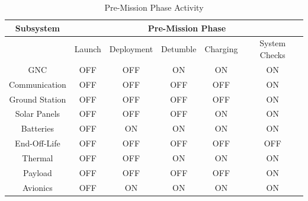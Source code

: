 \documentclass[3p]{elsarticle}
\begin{document}
\begin{table}[htbp]
  \centering
  \caption{Pre-Mission Phase Activity}
    \begin{tabular}{|c|c|c|c|c|c|}
    \hline
    \textbf{Subsystem} & \multicolumn{5}{c|}{\textbf{Pre-Mission Phase}} \\
\midrule
          & \multicolumn{1}{c}{Launch} & \multicolumn{1}{c}{Deployment} & \multicolumn{1}{c}{Detumble} & \multicolumn{1}{c}{Charging} & System Checks \\
    GNC   & \cellcolor[rgb]{ .753,  0,  0}OFF & \cellcolor[rgb]{ .753,  0,  0}OFF & \cellcolor[rgb]{ .573,  .816,  .314}ON & \cellcolor[rgb]{ .573,  .816,  .314}ON & \cellcolor[rgb]{ .573,  .816,  .314}ON \\
    Communication & \cellcolor[rgb]{ .753,  0,  0}OFF & \cellcolor[rgb]{ .753,  0,  0}OFF & \cellcolor[rgb]{ .753,  0,  0}OFF & \cellcolor[rgb]{ .753,  0,  0}OFF & \cellcolor[rgb]{ .573,  .816,  .314}ON \\
    Ground Station & \cellcolor[rgb]{ .753,  0,  0}OFF & \cellcolor[rgb]{ .753,  0,  0}OFF & \cellcolor[rgb]{ .753,  0,  0}OFF & \cellcolor[rgb]{ .753,  0,  0}OFF & \cellcolor[rgb]{ .573,  .816,  .314}ON \\
    Solar Panels  & \cellcolor[rgb]{ .753,  0,  0}OFF & \cellcolor[rgb]{ .753,  0,  0}OFF & \cellcolor[rgb]{ .753,  0,  0}OFF & \cellcolor[rgb]{ .573,  .816,  .314}ON & \cellcolor[rgb]{ .573,  .816,  .314}ON \\
   Batteries  & \cellcolor[rgb]{ .753,  0,  0}OFF & \cellcolor[rgb]{ .573,  .816,  .314}ON & \cellcolor[rgb]{ .573,  .816,  .314}ON & \cellcolor[rgb]{ .573,  .816,  .314}ON & \cellcolor[rgb]{ .573,  .816,  .314}ON \\
    End-Off-Life & \cellcolor[rgb]{ .753,  0,  0}OFF & \cellcolor[rgb]{ .753,  0,  0}OFF & \cellcolor[rgb]{ .753,  0,  0}OFF & \cellcolor[rgb]{ .753,  0,  0}OFF & \cellcolor[rgb]{ .753,  0,  0}OFF \\
   Thermal  & \cellcolor[rgb]{ .753,  0,  0}OFF & \cellcolor[rgb]{ .753,  0,  0}OFF & \cellcolor[rgb]{ .573,  .816,  .314}ON & \cellcolor[rgb]{ .573,  .816,  .314}ON & \cellcolor[rgb]{ .573,  .816,  .314}ON \\
   Payload & \cellcolor[rgb]{ .753,  0,  0}OFF & \cellcolor[rgb]{ .753,  0,  0}OFF & \cellcolor[rgb]{ .753,  0,  0}OFF & \cellcolor[rgb]{ .753,  0,  0}OFF & \cellcolor[rgb]{ .573,  .816,  .314}ON \\
    Avionics & \cellcolor[rgb]{ .753,  0,  0}OFF & \cellcolor[rgb]{ .573,  .816,  .314}ON & \cellcolor[rgb]{ .573,  .816,  .314}ON & \cellcolor[rgb]{ .573,  .816,  .314}ON & \cellcolor[rgb]{ .573,  .816,  .314}ON \\
    \hline
    \end{tabular}
  \label{tab:on1}
\end{table}
\end{document}
